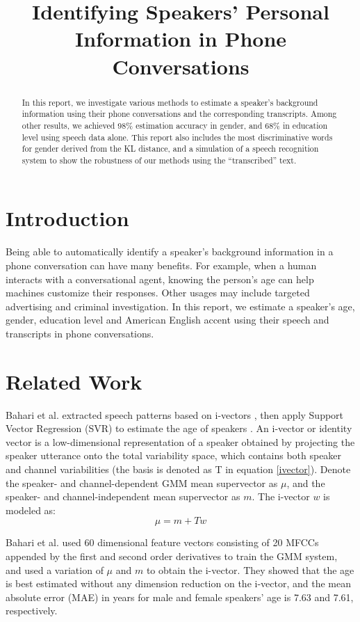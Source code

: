 \documentclass[a4paper]{article}
\title{Identifying Speakers' Personal Information in Phone Conversations}
\begin{document}
\maketitle


\begin{abstract}
In this report, we investigate various methods to estimate a speaker's background information using their phone conversations and the corresponding transcripts. Among other results, we achieved 98\% estimation accuracy in gender, and 68\% in education level using speech data alone. This report also includes the most discriminative words for gender derived from the KL distance, and a simulation of a speech recognition system to show the robustness of our methods using the ``transcribed'' text.
\end{abstract}


\section{Introduction}
Being able to automatically identify a speaker's background information in a phone conversation can have many benefits. For example, when a human interacts with a conversational agent, knowing the person's age can help machines customize their responses. Other usages may include targeted advertising and criminal investigation. In this report, we estimate a speaker's age, gender, education level and American English accent using their speech and transcripts in phone conversations.

\section{Related Work}
Bahari et al. extracted speech patterns based on i-vectors \cite{dehak}, then apply Support Vector Regression (SVR) to estimate the age of speakers \cite{bahari}. An i-vector or identity vector is a low-dimensional representation of a speaker obtained by projecting the speaker utterance onto the total variability space, which contains both speaker and channel variabilities (the basis is denoted as T in equation \ref{ivector}). Denote the speaker- and channel-dependent GMM mean supervector as $\mu$, and the speaker- and channel-independent mean supervector as $m$. The i-vector $w$ is modeled as:  
\begin{equation}
\mu = m + Tw
\label{ivector}
\end{equation}

Bahari et al. used 60 dimensional feature vectors consisting of 20 MFCCs appended by the first and second order derivatives to train the GMM system, and used a variation of $\mu$ and $m$ to obtain the i-vector. They showed that the age is best estimated without any dimension reduction on the i-vector, and the mean absolute error (MAE) in years for male and female speakers' age is 7.63 and 7.61, respectively.
\end{document}
